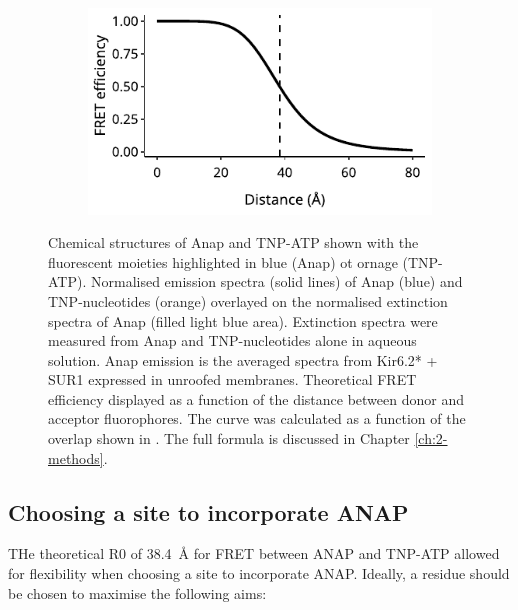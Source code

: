 \begin{figure}[h]
{\begin{subfigure}[t]{0.5\textwidth}
		\centering
		\includegraphics[width=\textwidth]{fret_efficiency.pdf}
	\end{subfigure}
	}
	\caption[Anap and TNP-nucleotides as FRET pairs]{
		 Chemical structures of Anap and TNP-ATP shown with the fluorescent moieties highlighted in blue (Anap) ot ornage (TNP-ATP).
		 Normalised emission spectra (solid lines) of Anap (blue) and TNP-nucleotides (orange) overlayed on the normalised extinction spectra of Anap (filled light blue area).
		Extinction spectra were measured from Anap and TNP-nucleotides alone in aqueous solution.
		Anap emission is the averaged spectra from Kir6.2* + SUR1 expressed in unroofed membranes.
		 Theoretical FRET efficiency displayed as a function of the distance between donor and acceptor fluorophores.
		The curve was calculated as a function of the overlap shown in .
		The full formula is discussed in Chapter \ref{ch:2-methods}.
	}

\end{figure}

\subsection{Choosing a site to incorporate ANAP}

THe theoretical R0 of \SI{38.4}{\angstrom} for FRET between ANAP and TNP-ATP allowed for flexibility when choosing a site to incorporate ANAP.
Ideally, a residue should be chosen to maximise the following aims:

